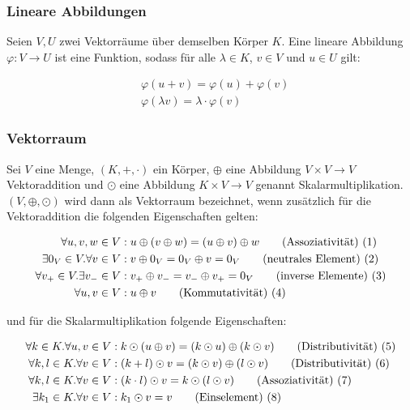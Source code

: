 \documentclass[a4paper,fontsize=12pt,toc=bib,halfparskip]{scrartcl}
\begin{document}
\subsubsection{Lineare Abbildungen}
Seien $V,U$ zwei Vektorr\"aume \"uber demselben K\"orper $K$. Eine lineare Abbildung $\varphi: V \rightarrow U$ ist eine Funktion, sodass f\"ur alle $\lambda \in K$, $v \in V$ und $u \in U$ gilt\cite[S.~85]{bowen2008introduction}:

\begin{align}
	&\varphi(u+v) = \varphi(u) + \varphi(v) \\
	&\varphi(\lambda v) = \lambda \cdot \varphi(v)
\end{align}

\subsubsection{Vektorraum}
Sei $V$ eine Menge, $(K, +, \cdot )$ ein K\"orper, $\oplus$ eine Abbildung $V \times V \rightarrow V$  Vektoraddition und $\odot$ eine Abbildung $K \times V \rightarrow V$ genannt Skalarmultiplikation. $(V, \oplus, \odot)$ wird dann als Vektorraum bezeichnet, wenn zus\"atzlich f\"ur die Vektoraddition die folgenden Eigenschaften gelten: 

\begin{align}
	\forall u,v,w \in V&: u \oplus (v \oplus w ) = (u \oplus v ) \oplus w 	\tag{Assoziativit\"at) (\addtocounter{equation}{1}\theequation}\\
	\exists 0_V \in V. \forall v \in V&: v\oplus 0_V = 0_V \oplus v = 0_V 	\tag{neutrales Element) (\addtocounter{equation}{1}\theequation}\\
	\forall v_+ \in V. \exists v_- \in V&: v_+ \oplus v_- = v_- \oplus v_+ = 0_V	\tag{inverse Elemente) (\addtocounter{equation}{1}\theequation}\\
	\forall u, v \in V&: u \oplus v    \tag{Kommutativit\"at) (\addtocounter{equation}{1}\theequation}
\end{align}

und f\"ur die Skalarmultiplikation folgende Eigenschaften:

\begin{align}
	\forall k \in K. \forall u,v \in V&: k \odot (u \oplus v ) = (k \odot u ) \oplus( k \odot v) 	\tag{Distributivit\"at) (\addtocounter{equation}{1}\theequation}\\
	\forall k, l \in K. \forall v \in V&: ( k + l ) \odot v = (k \odot v ) \oplus( l \odot v) 	\tag{Distributivit\"at) (\addtocounter{equation}{1}\theequation}\\
	\forall k, l \in K. \forall v \in V&: (k \cdot l) \odot v = k \odot (l \odot v)	\tag{Assoziativit\"at) (\addtocounter{equation}{1}\theequation}\\
	\exists k_1 \in K. \forall v \in V&: k_1 \odot v = v	\tag{Einselement) (\addtocounter{equation}{1}\theequation}
\end{align}
\end{document}
